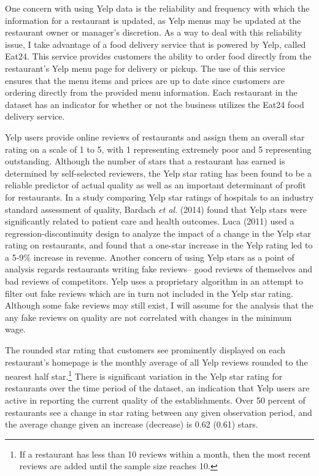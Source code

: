 \documentclass[11pt]{article}
\newcommand{\etal}{\textit{et al}. }
\begin{document}
One concern with using Yelp data is the reliability and frequency with which the information for a restaurant is updated, as Yelp menus may be updated at the restaurant owner or manager's discretion. As a way to deal with this reliability issue, I take advantage of a food delivery service that is powered by Yelp, called Eat24. This service provides customers the ability to order food directly from the restaurant's Yelp menu page for delivery or pickup. The use of this service ensures that the menu items and prices are up to date since customers are ordering directly from the provided menu information. Each restaurant in the dataset has an indicator for whether or not the business utilizes the Eat24 food delivery service. 

Yelp users provide online reviews of restaurants and assign them an overall star rating on a scale of 1 to 5, with 1 representing extremely poor and 5 representing outstanding. Although the number of stars that a restaurant has earned is determined by self-selected reviewers, the Yelp star rating has been found to be a reliable predictor of actual quality as well as an important determinant of profit for restaurants. In a study comparing Yelp star ratings of hospitals to an industry standard assessment of quality, Bardach \etal (2014) found that Yelp stars were significantly related to patient care and health outcomes. Luca (2011) used a regression-discontinuity design to analyze the impact of a change in the Yelp star rating on restaurants, and found that a one-star increase in the Yelp rating led to a 5-9\% increase in revenue. Another concern of using Yelp stars as a point of analysis regards restaurants writing fake reviews-- good reviews of themselves and bad reviews of competitors. Yelp uses a proprietary algorithm in an attempt to filter out fake reviews which are in turn not included in the Yelp star rating. Although some fake reviews may still exist, I will assume for the analysis that the any fake reviews on quality are not correlated with changes in the minimum wage. 

The rounded star rating that customers see prominently displayed on each restaurant's homepage is the monthly average of all Yelp reviews rounded to the nearest half star.\footnote{If a restaurant has less than 10 reviews within a month, then the most recent reviews are added until the sample size reaches 10.} There is significant variation in the Yelp star rating for restaurants over the time period of the dataset, an indication that Yelp users are active in reporting the current quality of the establishments. Over 50 percent of restaurants see a change in star rating between any given observation period, and the average change given an increase (decrease) is 0.62 (0.61) stars.
\end{document}
